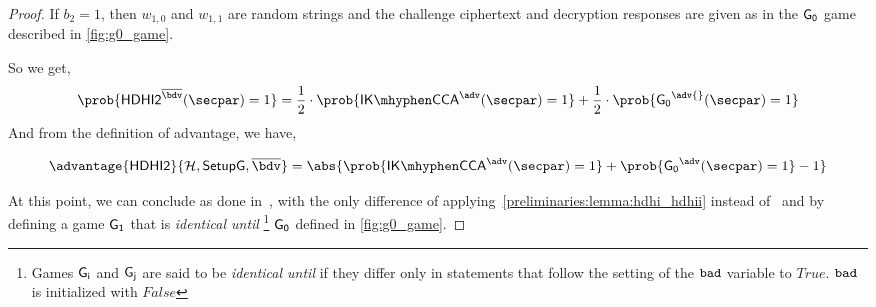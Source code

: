 \begin{proof}
    If $b_2=1$, then $w_{1, 0}$ and $w_{1, 1}$ are random strings and the challenge ciphertext and decryption responses are given as in the $\mathsf{G_0}$ game described in \cref{fig:g0_game}.

    So we get,
        \[
            \prob{\hdhii^{\bdvii{}}(\secpar) = 1} = \frac{1}{2}\cdot\prob{\ikcca^{\adv}(\secpar) = 1} + \frac{1}{2}\cdot\prob{\gamestyle{G_0}^\adv{}(\secpar) = 1}
        \]
    And from the definition of \hdhii{} advantage, we have,

        \[
            \advantage{\hdhii}{\hashSet,\groupSetup,\bdvii{}} = \abs{\prob{\ikcca^{\adv}(\secpar)=1} + \prob{\gamestyle{G_0}^{\adv}(\secpar)=1} - 1}
        \]

    At this point, we can conclude as done in~\cite[Theorem 6.2]{abdalla2010robust}, with the only difference of applying~\cref{preliminaries:lemma:hdhi_hdhii} instead of~\cite[Lemma 6.1]{abdalla2010robust} and by defining a game $\mathsf{G_1}$ that is \emph{identical until} \badvar\footnote{Games $\mathsf{G_i}$ and $\mathsf{G_j}$ are said to be \emph{identical until} \badvar if they differ only in statements that follow the setting of the $\texttt{bad}{}$ variable to $True$. $\texttt{bad}$ is initialized with $False$} $\mathsf{G_0}$ defined in \cref{fig:g0_game}.
\end{proof}


